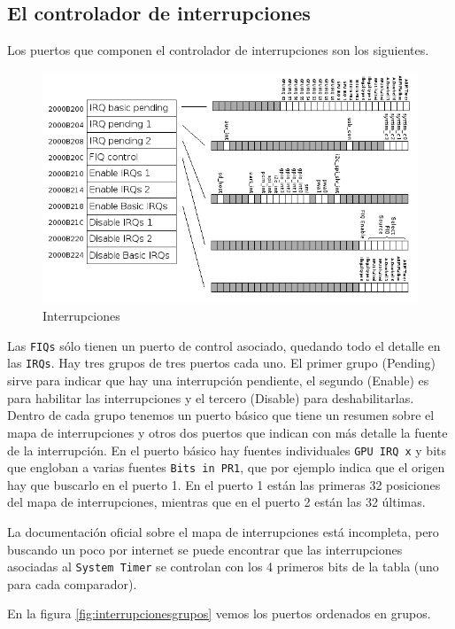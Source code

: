 \subsection{El controlador de interrupciones}

Los puertos que componen el controlador de interrupciones son los siguientes.

\begin{figure}[h]
  \centering
    \includegraphics[width=14cm]{graphs/interrupciones.png}
  \caption{Interrupciones}
  \label{fig:interrupciones}
\end{figure}

Las {\tt FIQs} sólo tienen un puerto de control asociado, quedando todo el detalle
en las {\tt IRQs}. Hay tres grupos de tres
puertos cada uno. El primer grupo (Pending) sirve para indicar que hay una interrupción
pendiente, el segundo (Enable) es para habilitar las interrupciones y el tercero (Disable)
para deshabilitarlas. Dentro de cada grupo tenemos un puerto básico que tiene un resumen
sobre el mapa de interrupciones y otros dos puertos que
indican con más detalle la fuente de la interrupción. En el puerto básico
hay fuentes individuales {\tt GPU IRQ x} y bits que engloban a varias fuentes {\tt Bits in PR1},
que por ejemplo indica que el origen hay que buscarlo en el puerto 1. En el puerto 1 están
las primeras 32 posiciones del mapa de interrupciones, mientras que en el puerto 2 están
las 32 últimas.

La documentación oficial sobre el mapa de interrupciones está incompleta, pero buscando un poco
por internet se puede encontrar que las interrupciones asociadas al {\tt System Timer} se
controlan con los 4 primeros bits de la tabla (uno para cada comparador).

En la figura \ref{fig:interrupcionesgrupos} vemos los puertos ordenados en grupos.

